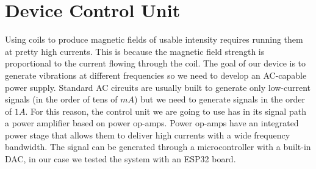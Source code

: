 \section{Device Control Unit}
Using coils to produce magnetic fields of usable intensity requires running them at pretty high currents.
This is because the magnetic field strength is proportional to the current flowing through the coil.
The goal of our device is to generate vibrations at different frequencies so we need to develop an AC-capable power supply.
Standard AC circuits are usually built to generate only low-current signals (in the order of tens of $mA$) but we need to generate signals in the order of $1A$.
For this reason, the control unit we are going to use has in its signal path a power amplifier based on power op-amps. Power op-amps have an integrated power stage that allows them to deliver high currents with a wide frequency bandwidth.
The signal can be generated through a microcontroller with a built-in DAC, in our case we tested the system with an ESP32 board.